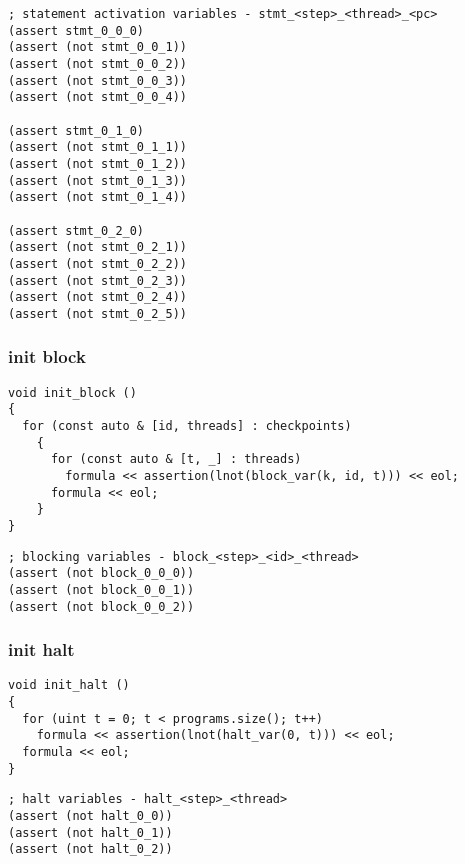 \begin{lstlisting}[language=SMTLib]
; statement activation variables - stmt_<step>_<thread>_<pc>
(assert stmt_0_0_0)
(assert (not stmt_0_0_1))
(assert (not stmt_0_0_2))
(assert (not stmt_0_0_3))
(assert (not stmt_0_0_4))

(assert stmt_0_1_0)
(assert (not stmt_0_1_1))
(assert (not stmt_0_1_2))
(assert (not stmt_0_1_3))
(assert (not stmt_0_1_4))

(assert stmt_0_2_0)
(assert (not stmt_0_2_1))
(assert (not stmt_0_2_2))
(assert (not stmt_0_2_3))
(assert (not stmt_0_2_4))
(assert (not stmt_0_2_5))
\end{lstlisting}

\subsubsection{init block}

\begin{lstlisting}[style=c++]
void init_block ()
{
  for (const auto & [id, threads] : checkpoints)
    {
      for (const auto & [t, _] : threads)
        formula << assertion(lnot(block_var(k, id, t))) << eol;
      formula << eol;
    }
}
\end{lstlisting}

\begin{lstlisting}[language=SMTLib]
; blocking variables - block_<step>_<id>_<thread>
(assert (not block_0_0_0))
(assert (not block_0_0_1))
(assert (not block_0_0_2))
\end{lstlisting}

\subsubsection{init halt}

\begin{lstlisting}[style=c++]
void init_halt ()
{
  for (uint t = 0; t < programs.size(); t++)
    formula << assertion(lnot(halt_var(0, t))) << eol;
  formula << eol;
}
\end{lstlisting}

\begin{lstlisting}[language=SMTLib]
; halt variables - halt_<step>_<thread>
(assert (not halt_0_0))
(assert (not halt_0_1))
(assert (not halt_0_2))
\end{lstlisting}

